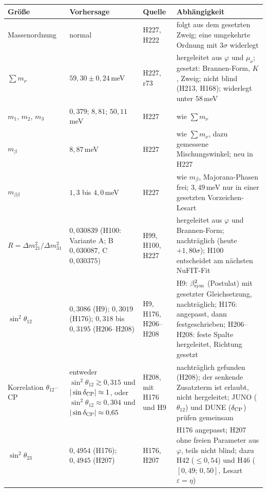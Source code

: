 \begin{center}
\small
\begin{tabular}{@{}p{.17\linewidth}p{.25\linewidth}p{.13\linewidth}p{.35\linewidth}@{}}
\hline
\textbf{Größe} & \textbf{Vorhersage} & \textbf{Quelle} & \textbf{Abhängigkeit}\\
\hline
\raggedright Massenordnung & \raggedright normal & \raggedright H227, H222 & \raggedright folgt aus dem gesetzten Zweig; eine umgekehrte Ordnung mit \(3\sigma\) widerlegt\tabularnewline
\raggedright \(\sum m_\nu\) & \raggedright \(59{,}30\pm0{,}24\)\,meV & \raggedright H227, r73 & \raggedright hergeleitet aus \(\varphi\) und \(\mu_\nu\); gesetzt: Brannen-Form, \(K\), Zweig; nicht blind (H213, H168); widerlegt unter \(58\)\,meV\tabularnewline
\raggedright \(m_1\), \(m_2\), \(m_3\) & \raggedright \(0{,}379\); \(8{,}81\); \(50{,}11\)\,meV & \raggedright H227 & \raggedright wie \(\sum m_\nu\)\tabularnewline
\raggedright \(m_\beta\) & \raggedright \(8{,}87\)\,meV & \raggedright H227 & \raggedright wie \(\sum m_\nu\), dazu gemessene Mischungswinkel; neu in H227\tabularnewline
\raggedright \(m_{\beta\beta}\) & \raggedright \(1{,}3\) bis \(4{,}0\)\,meV & \raggedright H227 & \raggedright wie \(m_\beta\), Majorana-Phasen frei; \(3{,}49\)\,meV nur in einer gesetzten Vorzeichen-Lesart\tabularnewline
\raggedright \(R=\Delta m^2_{21}/\Delta m^2_{31}\) & \raggedright \(0{,}030839\) (H100: Variante A; B \(0{,}030087\), C \(0{,}030375\)) & \raggedright H99, H100, H227 & \raggedright hergeleitet aus \(\varphi\) und Brannen-Form; nachträglich (heute \(+1{,}80\sigma\)); H100 entscheidet am nächsten NuFIT-Fit\tabularnewline
\raggedright \(\sin^2\theta_{12}\) & \raggedright \(0{,}3086\) (H9); \(0{,}3019\) (H176); \(0{,}318\) bis \(0{,}3195\) (H206--H208) & \raggedright H9, H176, H206--H208 & \raggedright H9: \(\beta_{\rm sym}^2\) (Postulat) mit gesetzter Gleichsetzung, nachträglich; H176: angepasst, dann festgeschrieben; H206--H208: feste Spalte hergeleitet, Richtung gesetzt\tabularnewline
\raggedright Korrelation \(\theta_{12}\)--CP & \raggedright entweder \(\sin^2\theta_{12}\gtrsim0{,}315\) und \(|\sin\delta_{\rm CP}|\approx1\), oder \(\sin^2\theta_{12}\approx0{,}304\) und \(|\sin\delta_{\rm CP}|\approx0{,}65\) & \raggedright H208, mit H176 und H9 & \raggedright nachträglich gefunden (H208); der senkende Zusatzterm ist erlaubt, nicht hergeleitet; JUNO (\(\theta_{12}\)) und DUNE (\(\delta_{\rm CP}\)) prüfen gemeinsam\tabularnewline
\raggedright \(\sin^2\theta_{23}\) & \raggedright \(0{,}4954\) (H176); \(0{,}4945\) (H207) & \raggedright H176, H207 & \raggedright H176 angepasst; H207 ohne freien Parameter aus \(\varphi\), teils nicht blind; dazu H42 (\(\le0{,}54\)) und H46 (\([0{,}49;\,0{,}50]\), Lesart \(\varepsilon=\eta\))\tabularnewline

\end{tabular}
\end{center}

